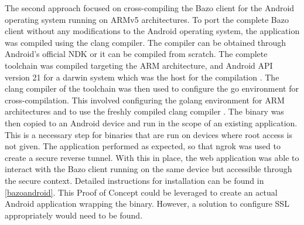The second approach focused on cross-compiling the Bazo client for the Android operating system running on ARMv5 architectures.
To port the complete Bazo client without any modifications to the Android operating system, the application was compiled using the clang compiler. The compiler can be obtained through Android's official NDK or it can be compiled from scratch. The complete toolchain was compiled targeting the ARM architecture, and Android API version 21 for a darwin system which was the host for the compilation \cite{standalonetoolchain}. The clang compiler of the toolchain was then used to configure the go environment for cross-compilation. This involved configuring the golang environment for ARM architectures and to use the freshly compiled clang compiler \cite{gobuild}.
The binary was then copied to an Android device and run in the scope of an existing application. This is a necessary step for binaries that are run on devices where root access is not given. The application performed as expected, so that ngrok was used to create a secure reverse tunnel. With this in place, the web application was able to interact with the Bazo client running on the same device but accessible through the secure context. Detailed instructions for installation can be found in \ref{bazoandroid}.
This Proof of Concept could be leveraged to create an actual Android application wrapping the binary. However, a solution to configure SSL appropriately would need to be found.


\newpage
